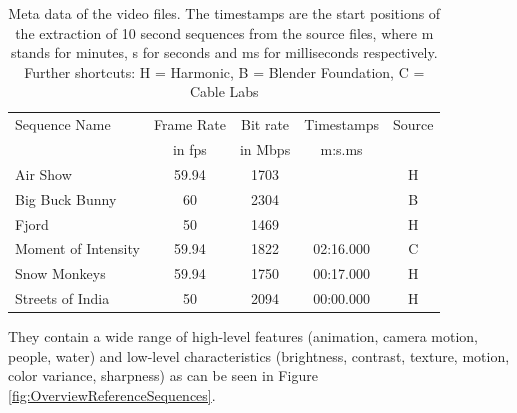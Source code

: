 \begin{table}[h]
	\centering
	\begin{tabular}{l|cccc}
		\toprule
		Sequence Name       & Frame Rate & Bit rate & Timestamps& Source\\
		& in fps   & in Mbps    & m:s.ms  & \\ \hline
		Air Show            & 59.94       & 1703 &            &   H  \\ \hline
		Big Buck Bunny      & 60       & 2304 & 		   &   B  \\ \hline
		Fjord               & 50       & 1469 & 		   &   H  \\ \hline
		Moment of Intensity & 59.94       & 1822 & 02:16.000  &   C \\ \hline
		Snow Monkeys        & 59.94       & 1750 & 00:17.000  &   H  \\ \hline
		Streets of India    & 50       & 2094 & 00:00.000  &   H  \\ \hline
	\end{tabular}
	\caption{Meta data of the video files. The timestamps are the start positions of the extraction of 10 second sequences from the source files, where m stands for minutes, s for seconds and ms for milliseconds respectively. Further shortcuts: H = Harmonic, B = Blender Foundation, C = Cable Labs}
	\label{tab:Specifications}
\end{table}

They contain a wide range of high-level features (animation, camera motion, people, water) and low-level characteristics (brightness, contrast, texture, motion, color variance, sharpness) as can be seen in Figure \ref{fig:OverviewReferenceSequences}.

